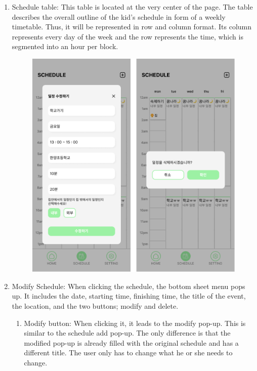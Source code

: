 \documentclass[conference]{IEEEtran}
\begin{document}
\begin{enumerate}[label=\arabic*.]
\begin{enumerate}[label=\alph*.]
        \item {\large{Schedule table: This table is located at the very center of the page. The table describes the overall outline of the kid’s schedule in form of a weekly timetable. Thus, it will be represented in row and column format. Its column represents every day of the week and the row represents the time, which is segmented into an hour per block. }} \\
        \begin{figure}[H]\centering \includegraphics[scale=0.4]{images/modify.png}\end{figure} 
        \item {\large{Modify Schedule: When clicking the schedule, the bottom sheet menu pops up. It includes the date, starting time, finishing time, the title of the event, the location, and the two buttons; modify and delete. }} \\      
        \begin{enumerate}[label=\roman*.]
            \item {\large{Modify button: When clicking it, it leads to the modify pop-up. This is similar to the schedule add pop-up. The only difference is that the modified pop-up is already filled with the original schedule and has a different title. The user only has to change what he or she needs to change. }} \\

\end{enumerate}
\end{enumerate}
\end{enumerate}
\end{document}
